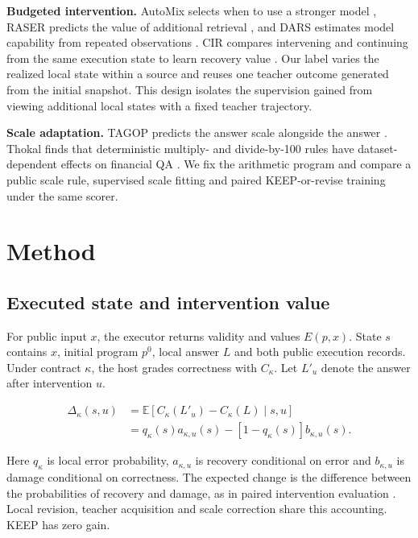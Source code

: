 \documentclass[10pt,letterpaper,conference]{IEEEtran}
\begin{document}
\textbf{Budgeted intervention.} AutoMix selects when to use a stronger model \cite{r10}, RASER predicts the value of additional retrieval \cite{r11}, and DARS estimates model capability from repeated observations \cite{r12}. CIR compares intervening and continuing from the same execution state to learn recovery value \cite{r5}. Our label varies the realized local state within a source and reuses one teacher outcome generated from the initial snapshot. This design isolates the supervision gained from viewing additional local states with a fixed teacher trajectory.

\textbf{Scale adaptation.} TAGOP predicts the answer scale alongside the answer \cite{r2}. Thokal finds that deterministic multiply- and divide-by-100 rules have dataset-dependent effects on financial QA \cite{r6}. We fix the arithmetic program and compare a public scale rule, supervised scale fitting and paired KEEP-or-revise training under the same scorer.

\section{Method}\label{method}

\subsection{Executed state and intervention value}\label{executed-state-and-intervention-value}

For public input \(x\), the executor returns validity and values \(E(p,x)\). State \(s\) contains \(x\), initial program \(p^0\), local answer \(L\) and both public execution records. Under contract \(\kappa\), the host grades correctness with \(C_\kappa\). Let \(L'_u\) denote the answer after intervention \(u\).

\[
\begin{aligned}
\Delta_\kappa(s,u)
&=\mathbb E[C_\kappa(L'_u)-C_\kappa(L)\mid s,u] \\
&=q_\kappa(s)a_{\kappa,u}(s)
  -[1-q_\kappa(s)]b_{\kappa,u}(s).
\end{aligned}
\tag{1}
\]

Here \(q_\kappa\) is local error probability, \(a_{\kappa,u}\) is recovery conditional on error and \(b_{\kappa,u}\) is damage conditional on correctness. The expected change is the difference between the probabilities of recovery and damage, as in paired intervention evaluation \cite{r5}. Local revision, teacher acquisition and scale correction share this accounting. KEEP has zero gain.
\end{document}
